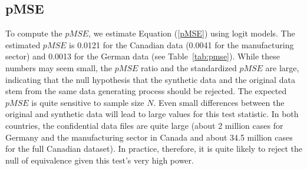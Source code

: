 %



\subsection{pMSE}


To compute the $pMSE$, we estimate Equation (\ref{pMSE}) using logit models. The estimated $pMSE$ is 0.0121 for the Canadian data (0.0041 for the manufacturing sector) and 0.0013 for the German data (see Table~\ref{tab:pmse}). While these numbers may seem small, the $pMSE$ ratio and the standardized $pMSE$ are large, indicating that the null hypothesis that the synthetic data and the original data stem from the same data generating process should be rejected. The expected $pMSE$ is quite sensitive to sample size $N$. Even small differences between the original and synthetic data will lead to large values for this test statistic. In both countries, the confidential data files are quite large (about 2 million cases for Germany and the manufacturing sector in Canada and about 34.5 million cases for the full Canadian dataset). In practice, therefore, it is quite likely to reject the null of equivalence  given this test's very high power. 





